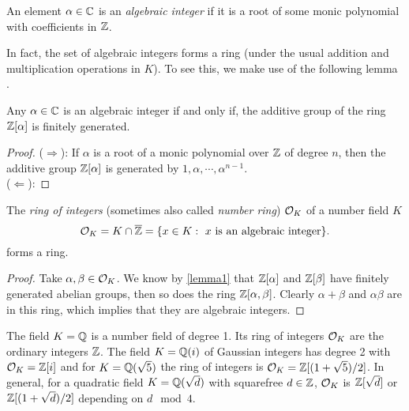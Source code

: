 \begin{definition}
    An element $\alpha \in \mathbb{C}$ is an \textit{algebraic integer} if it is a root of some monic polynomial with coefficients in $\mathbb{Z}$.
\end{definition}

In fact, the set of algebraic integers forms a ring (under the usual addition and multiplication operations in $K$). To see this, we make use of the following lemma .

\begin{lemma} \label{lemma1}
    Any $\alpha \in \mathbb{C}$ is an algebraic integer if and only if, the additive group of the ring $\mathbb{Z}[\alpha]$ is finitely generated.
\end{lemma}

\begin{proof}
    ($\Rightarrow$): If $\alpha$ is a root of a monic polynomial over $\mathbb{Z}$ of degree $n$, then the additive group $\mathbb{Z}[\alpha]$ is generated by $1, \alpha, \cdots, \alpha^{n-1}$. \\
    ($\Leftarrow$): 
\end{proof}

\begin{theorem}
The \textit{ring of integers} (sometimes also called \textit{number ring}) $\mathcal{O}_K$ of a number field $K$
$$
  \mathcal{O}_K = K \cap \overline{\mathbb{Z}} = \{x \in K : \text{ $x$ is an algebraic integer}\}.
$$
forms a ring.
\end{theorem}

\begin{proof}
    Take $\alpha, \beta \in \mathcal{O}_K$. We know by \ref{lemma1} that $\mathbb{Z}[\alpha]$ and $\mathbb{Z}[\beta]$ have finitely generated abelian groups, then so does the ring $\mathbb{Z}[\alpha, \beta]$. Clearly $\alpha + \beta$ and $\alpha\beta$ are in this ring, which implies that they are algebraic integers.
\end{proof}

\begin{example}
    The field $K = \mathbb{Q}$ is a number field of degree 1. Its ring of integers $\mathcal{O}_K$ are the ordinary integers $\mathbb{Z}$. The field $K = \mathbb{Q}(i)$ of Gaussian integers has degree 2 with $\mathcal{O}_K = \mathbb{Z}[i]$ and for $K = \mathbb{Q}(\sqrt{5})$ the ring of integers is $\mathcal{O}_K = \mathbb{Z}[(1 + \sqrt{5})/2]$. In general, for a quadratic field $K = \mathbb{Q}(\sqrt{d})$ with squarefree $d \in \mathbb{Z}$, $\mathcal{O}_K$ is $\mathbb{Z}[\sqrt{d}]$ or $\mathbb{Z}[(1 + \sqrt{d})/2]$ depending on $d \mod 4$.
\end{example}

